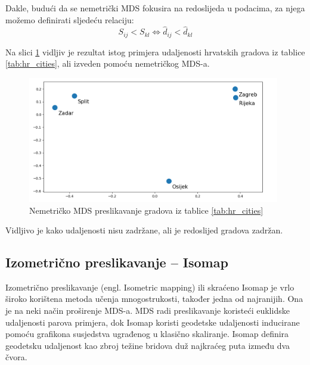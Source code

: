 \documentclass[times, utf8, diplomski]{fer}
\begin{document}
Dakle, budući da se nemetrički MDS fokusira na redoslijeda u podacima, za njega možemo definirati sljedeću relaciju:
\begin{equation}
    S_{ij} < S_{kl} \iff \hat{d}_{ij} < \hat{d}_{kl}
\end{equation}

Na slici \ref{fig:mds_mapping_hr_nonmetrc} vidljiv je rezultat istog primjera udaljenosti hrvatskih gradova iz tablice \ref{tab:hr_cities}, ali izveden pomoću nemetričkog MDS-a.

\begin{figure}[htb]
    \centering
    \includegraphics[width=11cm]{resources/images/reduction/mds_mapping_hr_nonmetric.png}
    \caption{Nemetričko MDS preslikavanje gradova iz tablice \ref{tab:hr_cities}}
    \label{fig:mds_mapping_hr_nonmetrc}
\end{figure}
Vidljivo je kako udaljenosti nisu zadržane, ali je redoslijed gradova zadržan.

\subsection{Izometrično preslikavanje -- Isomap}

Izometrično preslikavanje (engl. Isometric mapping) ili skraćeno Isomap je vrlo široko korištena metoda učenja mnogostrukosti, također jedna od najranijih. Ona je na neki način proširenje MDS-a. MDS radi preslikavanje koristeći euklidske udaljenosti parova primjera, dok Isomap koristi geodetske udaljenosti inducirane pomoću grafikona susjedstva ugrađenog u klasično skaliranje. Isomap definira geodetsku udaljenost kao zbroj težine bridova duž najkraćeg puta između dva čvora.
\end{document}
